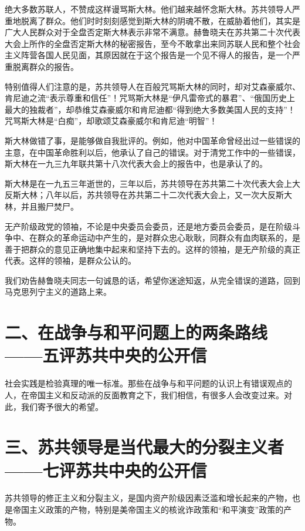 绝大多数苏联人，不赞成这样谩骂斯大林。他们越来越怀念斯大林。苏共领导人严重地脱离了群众。他们时时刻刻感觉到斯大林的阴魂不散，在威胁着他们，其实是广大人民群众对于全盘否定斯大林表示非常不满意。赫鲁晓夫在苏共第二十次代表大会上所作的全盘否定斯大林的秘密报告，至今不敢拿出来同苏联人民和整个社会主义阵营各国人民见面，其原因就在于这个报告是一个见不得人的报告，是一个严重脱离群众的报告。

特别值得人们注意的是，苏共领导人在百般咒骂斯大林的同时，却对艾森豪威尔、肯尼迪之流“表示尊重和信任”！咒骂斯大林是“伊凡雷帝式的暴君”、“俄国历史上最大的独裁者”，却恭维艾森豪威尔和肯尼迪都“得到绝大多数美国人民的支持”！咒骂斯大林是“白痴”，却歌颂艾森豪威尔和肯尼迪“明智”！

斯大林做错了事，是能够做自我批评的。例如，他对中国革命曾经出过一些错误的主意，在中国革命胜利以后，他承认了自己的错误。对于清党工作中的一些错误，斯大林在一九三九年联共第十八次代表大会上的报告中，也是承认了的。

斯大林是在一九五三年逝世的，三年以后，苏共领导在苏共第二十次代表大会上大反斯大林；八年以后，苏共领导在苏共第二十二次代表大会上，又一次大反斯大林，并且搬尸焚尸。

无产阶级政党的领袖，不论是中央委员会委员，还是地方委员会委员，是在阶级斗争中、在群众的革命运动中产生的，是对群众忠心耿耿，同群众有血肉联系的，是善于把群众的意见正确地集中起来和坚持下去的。这样的领袖，是无产阶级的真正代表。这样的领袖，是群众公认的。

我们劝告赫鲁晓夫同志一句诚恳的话，希望你迷途知返，从完全错误的道路，回到马克思列宁主义的道路上来。

\date{一九六三年十一月十九日}
\section{二、在战争与和平问题上的两条路线——五评苏共中央的公开信}

社会实践是检验真理的唯一标准。那些在战争与和平问题的认识上有错误观点的人，在帝国主义和反动派的反面教育之下，我们相信，有很多人会改变过来。对此，我们寄予很大的希望。

\date{一九六四年二月四日}
\section{三、苏共领导是当代最大的分裂主义者——七评苏共中央的公开信}

苏共领导的修正主义和分裂主义，是国内资产阶级因素泛滥和增长起来的产物，也是帝国主义政策的产物，特别是美帝国主义的核讹诈政策和“和平演变”政策的产物。

